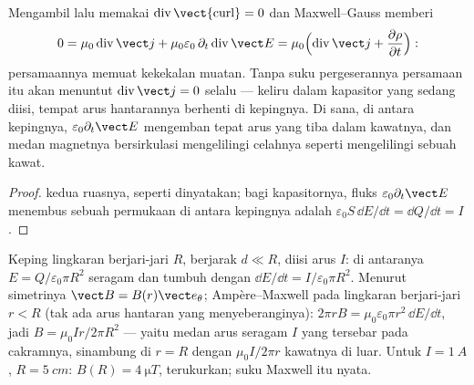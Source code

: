 \begin{proposition}\label{prop:b2:maxwell-equations:displacement}
Mengambil   lalu memakai
$\operatorname{div}\operatorname{\vect{curl}} = 0$ dan Maxwell--Gauss memberi
\[
0 = \mu_0\operatorname{div}\vect j + \mu_0\varepsilon_0\,\partial_t\operatorname{div}\vect E
= \mu_0\Bigl(\operatorname{div}\vect j + \frac{\partial\rho}{\partial t}\Bigr) :
\]
persamaannya memuat kekekalan muatan. Tanpa suku
pergeserannya persamaan itu akan menuntut $\operatorname{div}\vect j = 0$ selalu
--- keliru dalam kapasitor yang sedang diisi, tempat arus hantarannya berhenti
di kepingnya. Di sana, di antara kepingnya, $\varepsilon_0\partial_t\vect E$ mengemban
tepat arus yang tiba dalam kawatnya, dan medan magnetnya
bersirkulasi mengelilingi celahnya seperti mengelilingi sebuah kawat.
\end{proposition}

\begin{proof}
 kedua ruasnya, seperti dinyatakan; bagi kapasitornya, fluks
$\varepsilon_0\partial_t\vect E$ menembus sebuah permukaan di antara kepingnya adalah
$\varepsilon_0S\,\dd E/\dd t = \dd Q/\dd t = I$.
\end{proof}

\begin{example}\label{ex:b2:maxwell-equations:capacitor}
Keping lingkaran berjari-jari $R$, berjarak $d \ll R$, diisi arus
$I$: di antaranya $E = Q/\varepsilon_0\pi R^2$ seragam dan tumbuh dengan $\dd E/
\dd t = I/\varepsilon_0\pi R^2$. Menurut simetrinya $\vect B = B(r)\vect e_\theta$; Ampère--Maxwell
pada lingkaran berjari-jari $r < R$ (tak ada arus hantaran yang menyeberanginya): $2\pi rB
= \mu_0\varepsilon_0\pi r^2\,\dd E/\dd t$, jadi $B = \mu_0Ir/2\pi R^2$ --- yaitu medan
arus seragam $I$ yang tersebar pada cakramnya, sinambung di $r = R$ dengan
$\mu_0I/2\pi r$ kawatnya di luar. Untuk $I = \qty{1}{A}$, $R = \qty{5}{cm}$: $B(R) =
\qty{4}{\micro T}$, terukurkan; suku Maxwell itu nyata.
\end{example}

